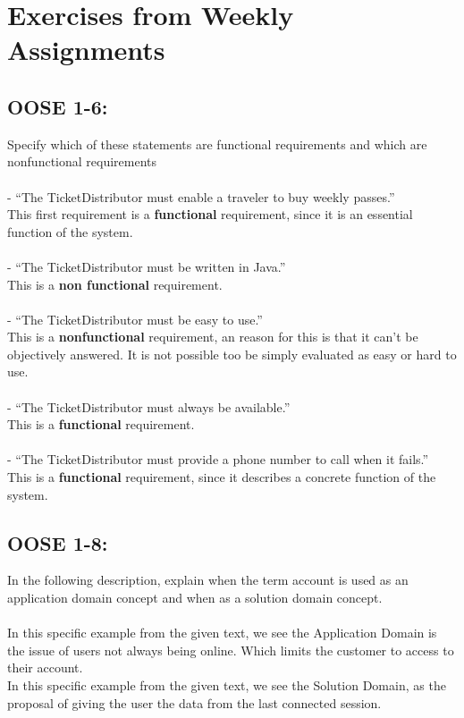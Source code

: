 \documentclass[11pt,a4paper]{article}
\begin{document}
\newpage
\section{Exercises from Weekly Assignments}

\subsection{OOSE 1-6:}
Specify which of these statements are functional requirements and which are
nonfunctional requirements\\\\
- “The TicketDistributor must enable a traveler to buy weekly passes.”\\
This first requirement is a \textbf{functional} requirement, since it is an essential function of the system.\\\\
- “The TicketDistributor must be written in Java.”\\
This is a \textbf{non functional} requirement.\\\\
- “The TicketDistributor must be easy to use.”\\
This is a \textbf{nonfunctional} requirement, an reason for this is that it can't be objectively answered. It is not possible too be simply evaluated as easy or hard to use.\\\\
- “The TicketDistributor must always be available.”\\
This is a \textbf{functional} requirement. \\\\
- “The TicketDistributor must provide a phone number to call when it fails.” \\
This is a \textbf{functional} requirement, since it describes a concrete function of the system.\\


\subsection{OOSE 1-8:}
In the following description, explain when the term account is used as an application domain concept and when as a solution domain concept.\\\\
In this specific example from the given text, we see the Application Domain is the issue of users not always being online. Which limits the customer to access to their account.\\
In this specific example from the given text, we see the Solution Domain, as the proposal of giving the user the data from the last connected session.\\
\newpage
\end{document}
